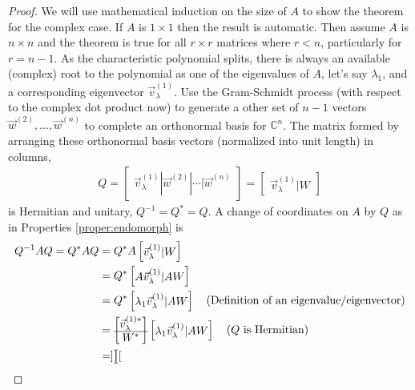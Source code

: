 \begin{proof}
We will use mathematical induction on the size of $A$ to show the theorem for the complex case. If $A$ is $1 \times 1$ then the result is automatic. Then assume $A$ is $n \times n$ and the theorem is true for all $r \times r$ matrices where $r < n$, particularly for $r = n-1$. As the characteristic polynomial splits, there is always an available (complex) root to the polynomial as one of the eigenvalues of $A$, let's say $\lambda_1$, and a corresponding eigenvector $\vec{v}_\lambda^{(1)}$. Use the Gram-Schmidt process (with respect to the complex dot product now) to generate a other set of $n-1$ vectors $\vec{w}^{(2)}, \ldots, \vec{w}^{(n)}$ to complete an orthonormal basis for $\mathbb{C}^n$. The matrix formed by arranging these orthonormal basis vectors (normalized into unit length) in columns,
\begin{align*}
Q = \begin{bmatrix}
\vec{v}_\lambda^{(1)} | \vec{w}^{(2)} | \cdots | \vec{w}^{(n)}
\end{bmatrix} =
\begin{bmatrix}
\vec{v}_\lambda^{(1)} | W
\end{bmatrix}
\end{align*}
is Hermitian and unitary, $Q^{-1} = Q^* = Q$. A change of coordinates on $A$ by $Q$ as in Properties \ref{proper:endomorph} is
\begin{align*}
Q^{-1}AQ = Q^* AQ &= Q^*A\begin{bmatrix}
\vec{v}_\lambda^{(1)} | W
\end{bmatrix} \\
&= Q^*\begin{bmatrix}
A\vec{v}_\lambda^{(1)} | AW
\end{bmatrix} \\
&= Q^*\begin{bmatrix}
\lambda_1\vec{v}_\lambda^{(1)} | AW
\end{bmatrix} \text{\quad (Definition of an eigenvalue/eigenvector)} \\
&= 
\begin{bmatrix}
\vec{v}_\lambda^{(1)*} \\
\hline
W^*
\end{bmatrix}
\begin{bmatrix}
\lambda_1\vec{v}_\lambda^{(1)} | AW
\end{bmatrix} \text{\quad ($Q$ is Hermitian)} \\
&= 
\begin{bmatrix}
\begin{bmatrix}

\end{bmatrix}
\end{bmatrix}
\end{align*}
\end{proof}
